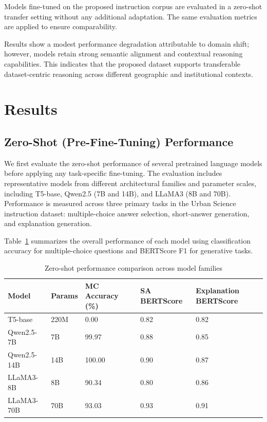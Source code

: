 \documentclass[a4paper,fleqn]{cas-sc}
\begin{document}
Models fine-tuned on the proposed instruction corpus are evaluated in a zero-shot transfer setting without any additional adaptation.
The same evaluation metrics are applied to ensure comparability.

Results show a modest performance degradation attributable to domain shift; however, models retain strong semantic alignment and contextual reasoning capabilities.
This indicates that the proposed dataset supports transferable dataset-centric reasoning across different geographic and institutional contexts.

\section{Results}

\subsection{Zero-Shot (Pre-Fine-Tuning) Performance}

We first evaluate the zero-shot performance of several pretrained language models before applying any task-specific fine-tuning. The evaluation includes representative models from different architectural families and parameter scales, including T5-base, Qwen2.5 (7B and 14B), and LLaMA3 (8B and 70B). Performance is measured across three primary tasks in the Urban Science instruction dataset: multiple-choice answer selection, short-answer generation, and explanation generation.

Table~\ref{tab:zeroshot_models} summarizes the overall performance of each model using classification accuracy for multiple-choice questions and BERTScore F1 for generative tasks.

\begin{table}[H]
\centering
\caption{Zero-shot performance comparison across model families}
\label{tab:zeroshot_models}
\begin{tabular}{|p{2cm}|p{1cm}|p{2cm}|p{1.5cm}|p{1.5cm}|}
\hline
Model & Params & MC Accuracy (\%) & SA BERTScore & Explanation BERTScore \\
\hline
T5-base & 220M & 0.00 & 0.82 & 0.82 \\
Qwen2.5-7B & 7B & 99.97 & 0.88 & 0.85 \\
Qwen2.5-14B & 14B & 100.00 & 0.90 & 0.87 \\
LLaMA3-8B & 8B & 90.34 & 0.80 & 0.86 \\
LLaMA3-70B & 70B & 93.03 & 0.93 & 0.91 \\
\hline
\end{tabular}
\end{table}
\end{document}
